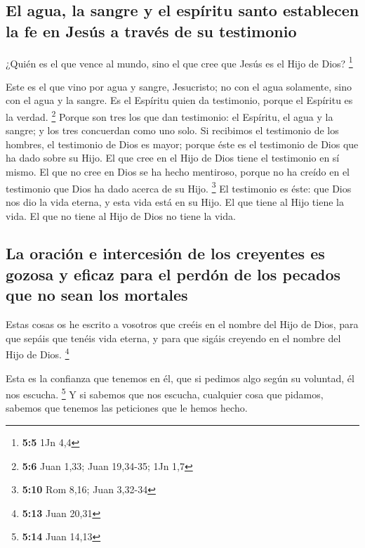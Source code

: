 \begin{paracol}{2}
{\subsection{El agua, la sangre y el espíritu santo establecen la fe en
Jesús a través de su
testimonio}\label{el-agua-la-sangre-y-el-espuxedritu-santo-establecen-la-fe-en-jesuxfas-a-travuxe9s-de-su-testimonio}}

 ¿Quién es el que vence al mundo, sino el que cree que
Jesús es el Hijo de Dios? \footnote{\textbf{5:5} 1Jn 4,4}

 Este es el que vino por agua y sangre, Jesucristo; no con
el agua solamente, sino con el agua y la sangre. Es el Espíritu quien da
testimonio, porque el Espíritu es la verdad. \footnote{\textbf{5:6} Juan
  1,33; Juan 19,34-35; 1Jn 1,7}  Porque son tres los que
dan testimonio:  el Espíritu, el agua y la sangre; y los
tres concuerdan como uno solo.  Si recibimos el testimonio
de los hombres, el testimonio de Dios es mayor; porque éste es el
testimonio de Dios que ha dado sobre su Hijo.  El que
cree en el Hijo de Dios tiene el testimonio en sí mismo. El que no cree
en Dios se ha hecho mentiroso, porque no ha creído en el testimonio que
Dios ha dado acerca de su Hijo. \footnote{\textbf{5:10} Rom 8,16; Juan
  3,32-34}  El testimonio es éste: que Dios nos dio la
vida eterna, y esta vida está en su Hijo.  El que tiene
al Hijo tiene la vida. El que no tiene al Hijo de Dios no tiene la vida.

\hypertarget{la-oraciuxf3n-e-intercesiuxf3n-de-los-creyentes-es-gozosa-y-eficaz-para-el-perduxf3n-de-los-pecados-que-no-sean-los-mortales}{%
\subsection{La oración e intercesión de los creyentes es gozosa y eficaz
para el perdón de los pecados que no sean los
mortales}\label{la-oraciuxf3n-e-intercesiuxf3n-de-los-creyentes-es-gozosa-y-eficaz-para-el-perduxf3n-de-los-pecados-que-no-sean-los-mortales}}

 Estas cosas os he escrito a vosotros que creéis en el
nombre del Hijo de Dios, para que sepáis que tenéis vida eterna, y para
que sigáis creyendo en el nombre del Hijo de Dios. \footnote{\textbf{5:13}
  Juan 20,31}

 Esta es la confianza que tenemos en él, que si pedimos
algo según su voluntad, él nos escucha. \footnote{\textbf{5:14} Juan
  14,13}  Y si sabemos que nos escucha, cualquier cosa
que pidamos, sabemos que tenemos las peticiones que le hemos hecho.


\end{paracol}
